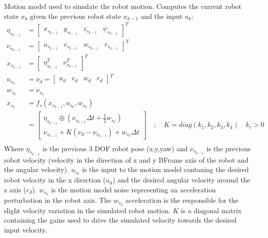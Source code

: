 \documentclass[letterpaper,10pt,english]{sphinxmanual}
\begin{document}
\begin{fulllineitems}
\begin{fulllineitems}
\label{\detokenize{robot_simulation:AUV4DOFSimulatedRobot.AUV4DOFSimulatedRobot.fs}}
\pysigstartsignatures
{}
\pysigstopsignatures
\sphinxAtStartPar
Motion model used to simulate the robot motion. Computes the current robot state \(x_k\) given the previous robot state \(x_{k-1}\) and the input \(u_k\):
\begin{equation}\label{equation:robot_simulation:eq:AUV4DOFSimulatedRobot-fs}
\begin{split}\eta_{s_{k-1}}&=\begin{bmatrix}x_{s_{k-1}} & y_{s_{k-1}} & z_{s_{k-1}} & \psi_{s_{k-1}}\end{bmatrix}^T\\
\nu_{s_{k-1}}&=\begin{bmatrix} u_{s_{k-1}} &  v_{s_{k-1}} & w_{s_{k-1}} & r_{s_{k-1}}\end{bmatrix}^T\\
x_{s_{k-1}}&=\begin{bmatrix}\eta_{s_{k-1}}^T & \nu_{s_{k-1}}^T\end{bmatrix}^T\\
u_{s_k}&=\nu_{d}=\begin{bmatrix} u_d& v_d& w_d& r_d\end{bmatrix}^T\\
w_{s_k}&=\dot \nu_{s_k}\\
x_{s_k}&=f_s(x_{s_{k-1}},u_{s_k},w_{s_k}) \\
&=\begin{bmatrix}
\eta_{s_{k-1}} \oplus (\nu_{s_{k-1}}\Delta t + \frac{1}{2} w_{s_k}) \\
\nu_{s_{k-1}}+K(\nu_{d}-\nu_{s_{k-1}}) + w_{s_k} \Delta t
\end{bmatrix} \quad;\quad K=diag(k_1,k_2,k_3,k_4) \quad k_i>0\\\end{split}
\end{equation}
\sphinxAtStartPar
Where \(\eta_{s_{k-1}}\) is the previous 3 DOF robot pose (x,y,yaw) and \(\nu_{s_{k-1}}\) is the previous robot velocity (velocity in the direction of x and y B\sphinxhyphen{}Frame axis of the robot and the angular velocity).
\(u_{s_k}\) is the input to the motion model contaning the desired robot velocity in the x direction (\(u_d\)) and the desired angular velocity around the z axis (\(r_d\)).
\(w_{s_k}\) is the motion model noise representing an acceleration perturbation in the robot axis. The \(w_{s_k}\) acceleration is the responsible for the slight velocity variation in the simulated robot motion.
\(K\) is a diagonal matrix containing the gains used to drive the simulated velocity towards the desired input velocity.


\end{fulllineitems}
\end{fulllineitems}
\end{document}
